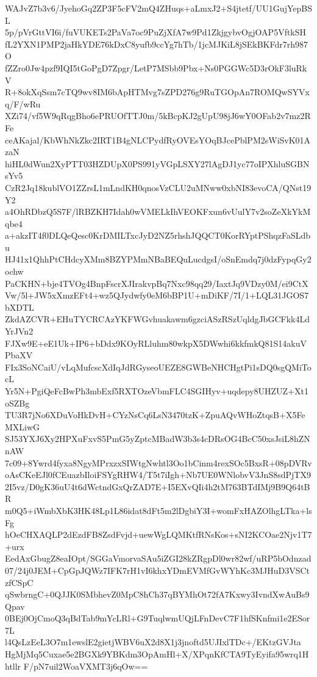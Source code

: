 WAJvZ7b3v6/JyehoGq2ZP3F5cFV2mQ4ZHuqs+aLmxJ2+S4jtetf/UU1GujYepBSL
5p/pVrGttVI6i/fuVUKETs2PaVa7oc9PuZjXfA7w9Pd1ZkjgybvOgjOAP5VftkSH
fL2YXN1PMP2jaHkYDE76kDxC8yufb9ccYg7hTb/1jcMJKiL8jSEkBKFdr7rh987O
fZZro0Jw4pzf9IQI5tGoPgD7Zpgr/LetP7MSbb9Pbx+Ns0PGGWc5D3rOkF3luRkV
R+8okXqSsm7cTQ9wv8IM6bApHTMvg7sZPD276g9RuTGOpAn7ROMQwSYVxq/F/wRu
XZi74/vf5W9qRqgBho6ePRUOfTTJ0m/5kBcpKJ2gUpU98jJ6wY0OFab2v7mz2RFe
ceAKajal/KbWhNkZkc2IRT1B4gNLCPydfRyOVEsYOqBJcePblPM2sWiSvK01AzaN
hiHL0dWun2XyPTT03HZDUpX0PS991yVGpLSXY27lAgDJ1yc77oIPXhluSGBNsYv5
CzR2Jq18kublVO1ZZrsL1mLndKH0qnosVzCLU2uMNww0xbNI83evoCA/QNst19Y2
a4OhRDbzQ5S7F/lRBZKH7Idah0wVMELkIhVEOKFxun6vUulY7v2soZeXkYkMqbe4
a+akzIT4f0DLQeQesc0KrDMILTxcJyD2NZ5rhshJQQCT0KorRYptPShqzFaSLdbu
HJ41x1QhhPtCHdcyXMm8BZYPMmNBaBEQuLucdgsI/oSnEmdq7j0dzFypqGy2ochw
PaCKHN+bje4TVOg4BnpFscrXJIrakvpBq7Nxc98qq29/IaxtJq9VDzy0M/ei9CtX
Vw/5l+JW5xXmzEFt4+wz5QJydwfy0eM6bBP1U+mDiKF/7I/1+LQL31JGOS7bXDTL
ZkdAZCVR+EHuTYCRCAzYKFWGvhuakawm6gzciASzRSzUqldgJbGCFkk4LdYrJVn2
FJXw9E+eE1Uk+IP6+bDdx9KOyRLluhm80wkpX5DWwhi6kkfmkQ81S14akuVPbaXV
FIx3SoNCaiU/vLqMufcscXdIqJdRGyseoUEZE8GWBeNHCHgtPi1sDQ0sgQMiTocL
Yr5N+PgiQeFcBwPh3mbExf5RXTOzeVbmFLC4SGIHyv+uqdepy8UHZUZ+Xt1oSZBg
TU3R7jNo6XDuVoHkDvH+CYzNsCq6LsN3470tzK+ZpuAQvWHoZtqsB+X5FeMXLiwG
SJ53YXJ6Xy2HPXuFxvS5PmG5yZptcMBadW3b3s4cDRsOG4BcC50xsJsiL8hZNnAW
7c09+8Ywrd4fyxa8NgyMPrxzxSIWtgNwhtl3Oo1bCinm4rexSOc5BxsR+08pDVRv
oAsCKeEJl0fCEuazbIloiFSYgRHW4/T5t7iIgh+Nb7UE0WNlobvV3JnS8sdPjTX9
2I5vz/D0gK36uU4t6dWctndGxQrZAD7E+I5EXvQIi4h2tM763BTdIMj9B9Q64tBR
m0Q5+iWmbXbK3HK48Lp1L86idat8dFt5m2lDgbiY3I+womFxHAZOlhgLTka+lsFg
hOeCHXAQLP2dEzdFB8ZsdFvjd+uewWgLQMKtfRNsKos+sNI2KCOae2Njv1T7+urx
EedAxGbugZ8eaIOpt/SGGaVmorvaSAu5iZGI28kZRgpDl0wr82wf/uRP5bOdnzad
07/24j0JEM+CpGpJQWz7IFK7rH1vI6khxYDmEVMfGvWYhKc3MJHuD3VSCtzfCSpC
qSwbrngC+0QJJK0SMbhevZ0MpC8hCh37qBYMhOt72fA7Kxwy3IvndXwAuBs9Qpav
0BEj0OjCmoQ3qBdTab9mYcLRl+G9TuqlwmUQjLFnDevC7F1hfSKnfmi1e2ESor7L
l4QsLzEeL3O7m1ewslE2gietjWBV6uX2d8X1j3jnoftd5UJIxlTDc+/EKtzGVJta
HgMjMq5Cuxae5e2BGXk9YBKdm3OpAmHl+X/XPqnKfCTA9TyEyifa95wrq1Hhtllr
F/pN7uil2WoaVXMT3j6qOw==
